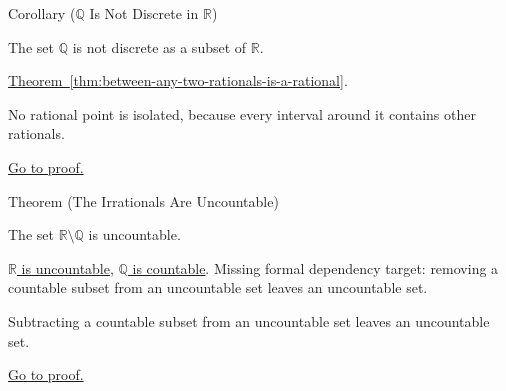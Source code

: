 \begin{corollarybox}{Corollary ($\mathbb{Q}$ Is Not Discrete in $\mathbb{R}$)}
\begin{corollary}
\label{cor:q-not-discrete-in-r}
The set $\mathbb{Q}$ is not discrete as a subset of $\mathbb{R}$.
\end{corollary}
\end{corollarybox}
\begin{dependencies}
\hyperref[thm:between-any-two-rationals-is-a-rational]{Theorem~\ref*{thm:between-any-two-rationals-is-a-rational}}.
\end{dependencies}
\begin{remark*}
No rational point is isolated, because every interval around it contains other
rationals.
\end{remark*}
\begin{remark*}[Proof]
\hyperref[prf:q-not-discrete-in-r]{Go to proof.}
\end{remark*}

\begin{theorembox}{Theorem (The Irrationals Are Uncountable)}
\begin{theorem}
\label{thm:irrationals-uncountable}
The set $\mathbb{R}\setminus\mathbb{Q}$ is uncountable.
\end{theorem}
\end{theorembox}
\begin{dependencies}
\hyperref[thm:R-uncountable]{$\mathbb{R}$ is uncountable},
\hyperref[thm:Q-countable]{$\mathbb{Q}$ is countable}.
Missing formal dependency target: removing a countable subset from an uncountable
set leaves an uncountable set.
\end{dependencies}
\begin{remark*}
Subtracting a countable subset from an uncountable set leaves an uncountable
set.
\end{remark*}
\begin{remark*}[Proof]
\hyperref[prf:irrationals-uncountable]{Go to proof.}
\end{remark*}

